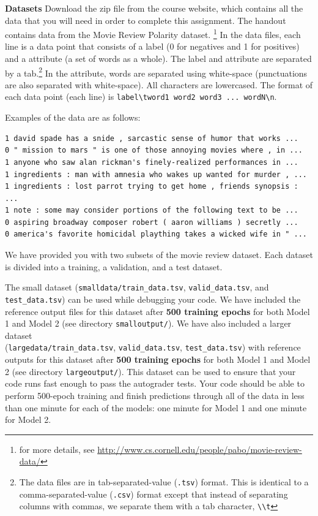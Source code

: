 \documentclass[11pt,addpoints,answers]{exam}
\begin{document}
  {\bf Datasets } 
 Download the zip file from the course website, which contains all the data that you will need in order to complete this assignment.
  The handout contains data from the Movie Review Polarity dataset. \footnote{for more details, see \url{http://www.cs.cornell.edu/people/pabo/movie-review-data/}} In the data files, each line is a data point that consists of a label (0 for negatives and 1 for positives) and a attribute (a set of words as a whole). The label and attribute are separated by a tab.\footnote{The data files are in tab-separated-value (\lstinline{.tsv}) format. This is identical to a comma-separated-value (\lstinline{.csv}) format except that instead of separating columns with commas, we separate them with a tab character, \lstinline{\\t}} In the attribute, words are separated using white-space (punctuations are also separated with white-space). All characters are lowercased. The format of each data point (each line) is \lstinline{label\tword1 word2 word3 ... wordN\n}.

Examples of the data are as follows:
 
\begin{lstlisting}
1 david spade has a snide , sarcastic sense of humor that works ... 
0 " mission to mars " is one of those annoying movies where , in ...
1 anyone who saw alan rickman's finely-realized performances in ...
1 ingredients : man with amnesia who wakes up wanted for murder , ...
1 ingredients : lost parrot trying to get home , friends synopsis : ... 
1 note : some may consider portions of the following text to be ...
0 aspiring broadway composer robert ( aaron williams ) secretly ...
0 america's favorite homicidal plaything takes a wicked wife in " ...
\end{lstlisting}

We have provided you with two subsets of the movie review dataset. Each dataset is divided into a training, a validation, and a test dataset.

The small dataset (\lstinline{smalldata/train_data.tsv}, \lstinline{valid_data.tsv}, and \lstinline{test_data.tsv}) can be used while debugging your code. We have included the reference output files for this dataset after \textbf{500 training epochs} for both Model 1 and Model 2 (see directory \lstinline{smalloutput/}). 
%
We have also included a larger dataset \\(\lstinline{largedata/train_data.tsv}, \lstinline{valid_data.tsv}, \lstinline{test_data.tsv}) with reference outputs for this dataset after \textbf{500 training epochs} for both Model 1 and Model 2 (see directory \lstinline{largeoutput/}). This dataset can be used to ensure that your code runs fast enough to pass the autograder tests. Your code should be able to perform 500-epoch training and finish  predictions through all of the data in less than one minute for each of the models: one minute for Model 1 and one minute for Model 2.
\end{document}

